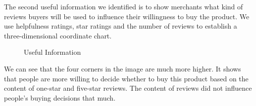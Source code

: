 \documentclass[12pt]{mcmthesis}
\begin{document}
The second useful information we identified is to show merchants what kind of reviews buyers will be used to influence their willingness to buy the product. We use helpfulness ratings, star ratings and the number of reviews to establish a three-dimensional coordinate chart.

\begin{figure}[htbp]
	\centering
	
	\quad
	
	\quad
	
	\caption{Useful Information}
\end{figure}
\newpage
We can see that the four corners in the image are much more higher. It shows that people are more willing to decide whether to buy this product based on the content of one-star and five-star reviews. The content of reviews did not influence people's buying decisions that much.
\end{document}
